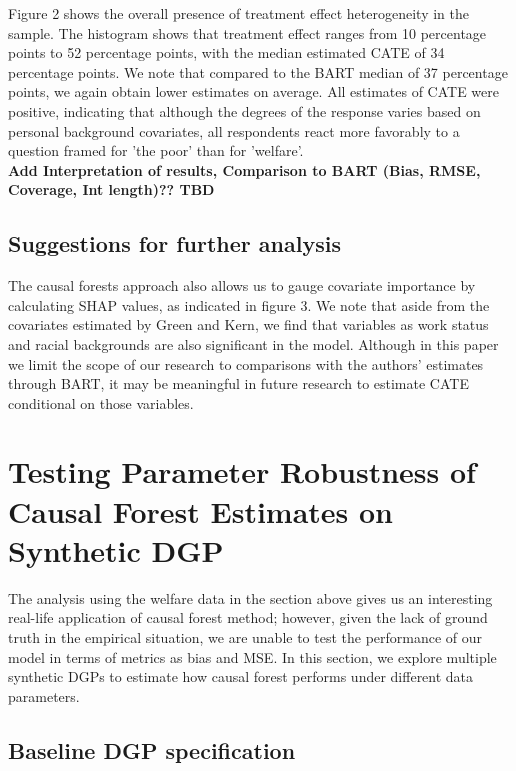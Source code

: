 \documentclass[12pt]{article}
\begin{document}
Figure 2 shows the overall presence of treatment effect heterogeneity in the sample. The histogram shows that treatment effect ranges from 10 percentage points to 52 percentage points, with the median estimated CATE of 34 percentage points. We note that compared to the BART median of 37 percentage points, we again obtain lower estimates on average. All estimates of CATE were positive, indicating that although the degrees of the response varies based on personal background covariates, all respondents react more favorably to a question framed for 'the poor' than for 'welfare'. \\

\textbf{Add Interpretation of results, Comparison to BART (Bias, RMSE, Coverage, Int length)?? TBD} 

\subsection{Suggestions for further analysis}
The causal forests approach also allows us to gauge covariate importance by calculating SHAP values, as indicated in figure 3.  We note that aside from the covariates estimated by Green and Kern, we find that variables as work status and racial backgrounds are also significant in the model. Although in this paper we limit the scope of our research to comparisons with the authors' estimates through BART, it may be meaningful in future research to estimate CATE conditional on those variables. 







\section{Testing Parameter Robustness of Causal Forest Estimates on Synthetic DGP} 

The analysis using the welfare data in the section above gives us an interesting real-life application of causal forest method; however, given the lack of ground truth in the empirical situation, we are unable to test the performance of our model in terms of metrics as bias and MSE. In this section, we explore multiple synthetic DGPs to estimate how causal forest performs under different data parameters. 

\subsection{Baseline DGP specification} 
\end{document}
